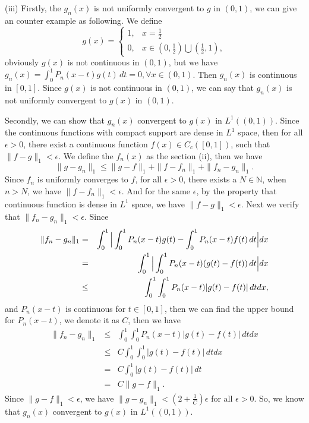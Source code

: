\documentclass[12pt,a4paper]{ctexart}
\begin{document}
(iii) Firstly, the $g_{n}(x)$ is not uniformly convergent to $g$ in $(0, 1)$, we can give an counter example as following. We define 
\begin{equation*}
g(x) =
\left\{
             \begin{array}{cl}
             1, & x = \frac{1}{2} \\
             0, & x \in (0, \frac{1}{2}) \bigcup (\frac{1}{2}, 1),
             \end{array}
\right.
\end{equation*}
obviously $g(x)$ is not continuous in $(0, 1)$, but we have $g_{n} (x) = \int_{0}^{1} P_{n}(x -t)g(t) \, d t = 0, \forall x \in (0, 1)$. Then $g_{n} (x)$ is continuous in $[0, 1]$. Since $g(x)$ is not continuous in $(0, 1)$, we can say that $g_{n}(x)$ is not uniformly convergent to $g(x)$ in $(0, 1)$.

Secondly, we can show that $g_{n}(x)$ convergent to $g(x)$ in $L^{1}((0, 1))$. Since the continuous functions with compact support are dense in $L^{1}$ space, then for all $\epsilon > 0$, there exist a continuous function $f(x) \in C_{c}([0, 1])$, such that $\|f- g \|_{1} < \epsilon$. We define the $f_{n}(x)$ as the section (ii), then we have
\begin{equation*}
\|g- g_{n} \|_{1} \leq  \|g- f \|_{1} + \|f- f_{n} \|_{1} + \|f_{n}- g_{n} \|_{1}.
\end{equation*}
Since $f_{n}$ is uniformly converges to $f$, for all $\epsilon > 0$, there exists a $N \in \mathbb{N}$, when $n > N$, we have $\|f- f_{n} \|_{1} < \epsilon$. And for the same $\epsilon$, by the property that continuous function is dense in $L^{1}$ space, we have $\|f- g \|_{1} < \epsilon$. Next we verify that $\|f_{n}- g_{n} \|_{1} < \epsilon$. Since
\begin{eqnarray*}
\|f_{n}- g_{n} \|_{1} &=& \int_{0}^{1} \Big{|} \int_{0}^{1}  P_{n}(x-t) g(t) - \int_{0}^{1}  P_{n}(x-t) f(t) \, d t \Big{|} d x  \\
&=& \int_{0}^{1} \Big{|} \int_{0}^{1}  P_{n}(x-t) (g(t) - f(t)) \, d t \Big{|} d x  \\
&\leq& \int_{0}^{1}  \int_{0}^{1}  P_{n}(x-t) |g(t) - f(t)|\, d t  d x,
\end{eqnarray*}
and $P_{n}(x-t)$ is continuous for $t \in [0, 1]$, then we can find the upper bound for  $P_{n}(x-t)$, we denote it as $C$, then we have
\begin{eqnarray*}
\|f_{n}- g_{n} \|_{1} &\leq&  \int_{0}^{1}  \int_{0}^{1}  P_{n}(x-t) |g(t) - f(t)|\, d t  d x \\
&\leq&  C \int_{0}^{1}  \int_{0}^{1} |g(t) - f(t)|\, d t  d x \\
&=&  C \int_{0}^{1} |g(t) - f(t)|\, d t \\
&=& C \|g-f \|_{1}.
\end{eqnarray*}
Since $\|g-f \|_{1} < \epsilon$, we have $\|g-g_{n} \|_{1} < (2 + \frac{1}{C}) \epsilon$ for all $\epsilon > 0$. So, we know that $g_{n}(x)$ convergent to $g(x)$ in $L^{1}((0, 1))$.
\end{document}
